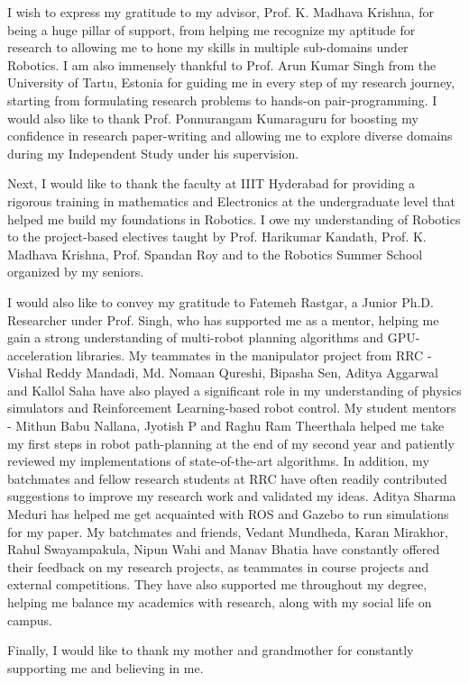 I wish to express my gratitude to my advisor, Prof. K. Madhava Krishna, for being a huge pillar of support, from helping me recognize my aptitude for research to allowing me to hone my skills in multiple sub-domains under Robotics. I am also immensely thankful to Prof. Arun Kumar Singh from the University of Tartu, Estonia for guiding me in every step of my research journey, starting from formulating research problems to hands-on pair-programming. I would also like to thank Prof. Ponnurangam Kumaraguru for boosting my confidence in research paper-writing and allowing me to explore diverse domains during my Independent Study under his supervision.

Next, I would like to thank the faculty at IIIT Hyderabad for providing a rigorous training in mathematics and Electronics at the undergraduate level that helped me build my foundations in Robotics. I owe my understanding of Robotics to the project-based electives taught by Prof. Harikumar Kandath, Prof. K. Madhava Krishna, Prof. Spandan Roy and to the Robotics Summer School organized by my seniors. 


I would also like to convey my gratitude to Fatemeh Rastgar, a Junior Ph.D. Researcher under Prof. Singh, who has supported me as a mentor, helping me gain a strong understanding of multi-robot planning algorithms and GPU-acceleration libraries. My teammates in the manipulator project from RRC - Vishal Reddy Mandadi, Md. Nomaan Qureshi, Bipasha Sen, Aditya Aggarwal and Kallol Saha have also played a significant role in my understanding of physics simulators and Reinforcement Learning-based robot control. My student mentors - Mithun Babu Nallana, Jyotish P and Raghu Ram Theerthala helped me take my first steps in robot path-planning at the end of my second year and patiently reviewed my implementations of state-of-the-art algorithms. In addition, my batchmates and fellow research students at RRC have often readily contributed suggestions to improve my research work and validated my ideas. Aditya Sharma Meduri has helped me get acquainted with ROS and Gazebo to run simulations for my paper. My batchmates and friends, Vedant Mundheda, Karan Mirakhor, Rahul Swayampakula, Nipun Wahi and Manav Bhatia have constantly offered their feedback on my research projects, as teammates in course projects and external competitions. They have also supported me throughout my degree, helping me balance my academics with research, along with my social life on campus.

Finally, I would like to thank my mother and grandmother for constantly supporting me and believing in me. 
